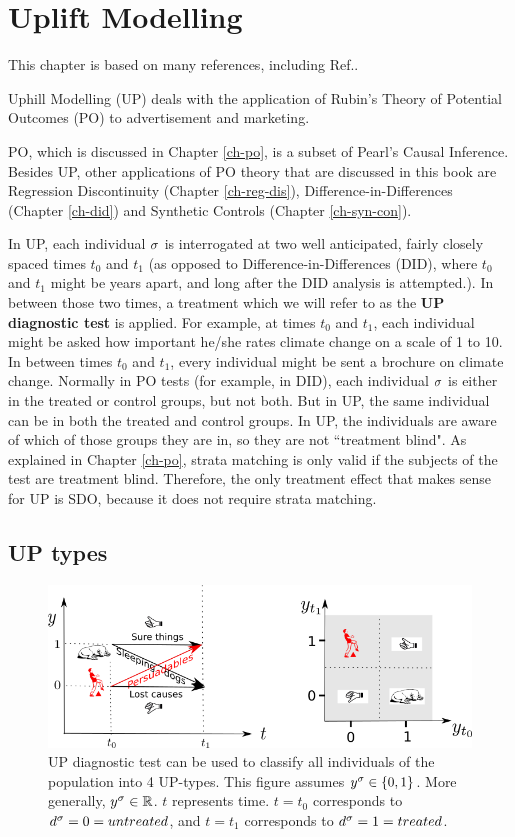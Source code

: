 \chapter{Uplift Modelling}
\label{ch-uplift}



This chapter is based 
on 
many references,
including Ref.\cite{uplift-2017, fei, wiki-uplift}.

Uphill Modelling (UP)
deals
with  the application of
Rubin's Theory of
Potential Outcomes (PO)
to advertisement and marketing.

PO, which is
discussed in Chapter \ref{ch-po},
 is a subset
of Pearl's Causal Inference.
Besides UP, other  applications of PO theory
that are discussed in this book 
are Regression Discontinuity (Chapter \ref{ch-reg-dis}),
Difference-in-Differences (Chapter \ref{ch-did})
and Synthetic Controls (Chapter \ref{ch-syn-con}).

In UP,
each individual $\sigma$
is interrogated at two well
anticipated, fairly closely spaced times
$t_0$ and $t_1$ (as opposed to 
Difference-in-Differences  (DID), where
$t_0$ and $t_1$ might
be years apart, and
long after the DID analysis is 
attempted.).
In between those two times,
a treatment which
we will refer to as the
{\bf UP diagnostic test} is applied.
For example,
at times $t_0$ and $t_1$,
each individual
might be asked
how important he/she rates climate 
change on a scale of 1 to 10.
In between times
$t_0$ and $t_1$,
every individual might
be sent a brochure on climate change.
Normally
in PO tests
(for example, in DID),
each individual
$\sigma$
is either in the 
treated or control
groups, but not both.
But in UP,
the same individual
can be in both the 
treated and control groups.
In UP,
the individuals
are aware  of which
of those groups they are in,
so they are not ``treatment blind".
As explained in 
Chapter \ref{ch-po},
strata matching is only valid
if the subjects
of the test are treatment blind.
Therefore, the only
treatment effect that 
makes sense for UP is SDO,
because it
 does not require strata matching.

\section{UP types}

\begin{figure}[h!]
\centering
\includegraphics[width=6in]
{uplift/uplift-y-t.png}
\caption{UP diagnostic test
can be used to classify
all individuals of the
population into 4 UP-types.
This figure 
assumes $y^\sigma\in \{0,1\}$.
More generally, $y^\sigma\in { \mathbb{R}}$.
$t$ represents time. $t=t_0$
corresponds to $d^\sigma=0=untreated$,
and $t=t_1$ corresponds to $d^\sigma=1=treated$.} 
\label{fig-uplift-y-t}
\end{figure}

